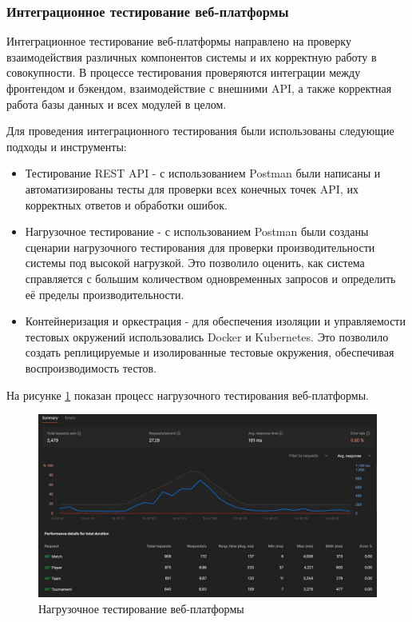 \subsubsection{Интеграционное тестирование веб-платформы}

Интеграционное тестирование веб-платформы направлено на проверку взаимодействия различных компонентов системы и их корректную работу в совокупности. В процессе тестирования проверяются интеграции между фронтендом и бэкендом, взаимодействие с внешними API, а также корректная работа базы данных и всех модулей в целом.

Для проведения интеграционного тестирования были использованы следующие подходы и инструменты:

\begin{itemize}
	\item Тестирование REST API - с использованием Postman были написаны и автоматизированы тесты для проверки всех конечных точек API, их корректных ответов и обработки ошибок.
	\item Нагрузочное тестирование - с использованием Postman были созданы сценарии нагрузочного тестирования для проверки производительности системы под высокой нагрузкой. Это позволило оценить, как система справляется с большим количеством одновременных запросов и определить её пределы производительности.
	\item Контейнеризация и оркестрация - для обеспечения изоляции и управляемости тестовых окружений использовались Docker и Kubernetes. Это позволило создать реплицируемые и изолированные тестовые окружения, обеспечивая воспроизводимость тестов.
\end{itemize}

На рисунке \ref{fig:-Postman} показан процесс нагрузочного тестирования веб-платформы.

\begin{figure}
	\centering
	\includegraphics[width=1\linewidth]{"images/Postman"}
	\caption{Нагрузочное тестирование веб-платформы}
	\label{fig:-Postman}
\end{figure}